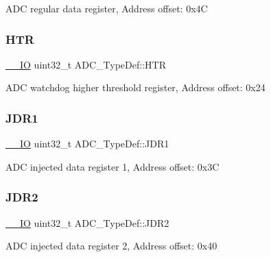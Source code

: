 A\+DC regular data register, Address offset\+: 0x4C \mbox{\label{struct_a_d_c___type_def_a297ac2d83a1837bfdc0333474b977de0}} 
\subsubsection{\texorpdfstring{H\+TR}{HTR}}
{\footnotesize\ttfamily \hyperlink{core__sc300_8h_aec43007d9998a0a0e01faede4133d6be}{\+\_\+\+\_\+\+IO} uint32\+\_\+t A\+D\+C\+\_\+\+Type\+Def\+::\+H\+TR}

A\+DC watchdog higher threshold register, Address offset\+: 0x24 \mbox{\label{struct_a_d_c___type_def_ab4b0a79a9e4a9d5b0a24d7285cf55bdc}} 
\subsubsection{\texorpdfstring{J\+D\+R1}{JDR1}}
{\footnotesize\ttfamily \hyperlink{core__sc300_8h_aec43007d9998a0a0e01faede4133d6be}{\+\_\+\+\_\+\+IO} uint32\+\_\+t A\+D\+C\+\_\+\+Type\+Def\+::\+J\+D\+R1}

A\+DC injected data register 1, Address offset\+: 0x3C \mbox{\label{struct_a_d_c___type_def_a898b87cab4f099bcca981cc4c9318b51}} 
\subsubsection{\texorpdfstring{J\+D\+R2}{JDR2}}
{\footnotesize\ttfamily \hyperlink{core__sc300_8h_aec43007d9998a0a0e01faede4133d6be}{\+\_\+\+\_\+\+IO} uint32\+\_\+t A\+D\+C\+\_\+\+Type\+Def\+::\+J\+D\+R2}

A\+DC injected data register 2, Address offset\+: 0x40 \mbox{\label{struct_a_d_c___type_def_a40999cd0a255ef62b2340e2726695063}} 
